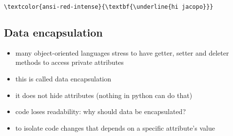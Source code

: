 \documentclass[11pt]{article}
\providecommand{\tightlist}{%
      \setlength{\itemsep}{0pt}\setlength{\parskip}{0pt}}
\begin{document}
    \begin{Verbatim}[commandchars=\\\{\}]
\textcolor{ansi-red-intense}{\textbf{\underline{hi jacopo}}}
    \end{Verbatim}

    \hypertarget{data-encapsulation}{%
\subsection{Data encapsulation}\label{data-encapsulation}}

\begin{itemize}
\tightlist
\item
  many object-oriented languages stress to have getter, setter and
  deleter methods to access private attributes
\item
  this is called data encapsulation
\item
  it does not hide attributes (nothing in python can do that)
\item
  code loses readability: why should data be encapsulated?
\item
  to isolate code changes that depends on a specific attribute's value
\end{itemize}
\end{document}
